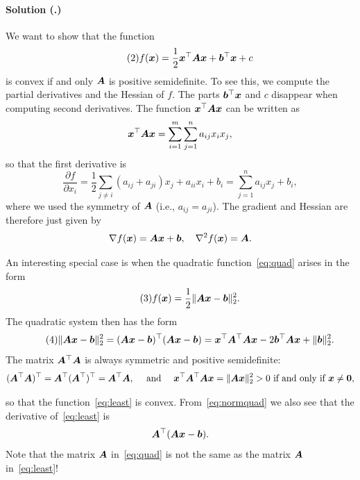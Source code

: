\documentclass{article}
\newcounter{problemSheetNumber}
\newcounter{problems}
\renewcommand{\solution}[1]{\paragraph{Solution (\theproblemSheetNumber.\theproblems)}\addtocounter{problems}{1}\label{#1}}
\begin{document}
\solution{pr:2} We want to show that the function
\begin{equation}\label{eq:quad}\tag{2}
f(\bm{x}) = \frac{1}{2}\bm{x}^{\top}\bm{A}\bm{x}+\bm{b}^{\top}\bm{x}+c  
 \end{equation}
is convex if and only $\bm{A}$ is positive semidefinite.
To see this, we compute the partial derivatives and the Hessian of $f$. The parts $\bm{b}^{\top}\bm{x}$ and $c$ disappear when computing second derivatives. The function $\bm{x}^{\top}\bm{A}\bm{x}$ can be written as
\begin{equation*}
 \bm{x}^{\top}\bm{A}\bm{x} = \sum_{i=1}^m\sum_{j=1}^n a_{ij}x_ix_j,
\end{equation*}
so that the first derivative is
\begin{equation*}
 \frac{\partial f}{\partial x_i} = \frac{1}{2} \sum_{j\neq i} (a_{ij}+a_{ji}) x_j + a_{ii}x_i+b_i = \sum_{j=1}^n a_{ij}x_j+b_i,
\end{equation*}
where we used the symmetry of $\bm{A}$ (i.e., $a_{ij}=a_{ji}$). The gradient and Hessian are therefore just given by
\begin{equation*}
 \nabla f(\bm{x}) = \bm{A}\bm{x}+\bm{b}, \quad \nabla^2f(\bm{x}) = \bm{A}.
\end{equation*}

An interesting special case is when the quadratic function~\eqref{eq:quad} arises in the form
\begin{equation}\label{eq:least}\tag{3}
 f(\bm{x}) = \frac{1}{2}\Vert {\bm{A}\bm{x}-\bm{b}}\Vert_2^2. 
\end{equation}
The quadratic system then has the form
\begin{equation}\label{eq:normquad}\tag{4}
 \Vert {\bm{A}\bm{x}-\bm{b}}\Vert_2^2 = (\bm{A}\bm{x}-\bm{b})^{\top}(\bm{A}\bm{x}-\bm{b}) = \bm{x}^{\top}\bm{A}^{\top}\bm{A}\bm{x}-2\bm{b}^{\top}\bm{A}\bm{x}+\Vert {\bm{b}}\Vert_2^2.
\end{equation}
The matrix $\bm{A}^{\top}\bm{A}$ is always symmetric and positive semidefinite:
\begin{equation*}
 (\bm{A}^{\top}\bm{A})^{\top} = \bm{A}^{\top}(\bm{A}^{\top})^{\top} = \bm{A}^{\top}\bm{A}, \quad \text{ and } \quad \bm{x}^{\top}\bm{A}^\top\bm{A}\bm{x} = \Vert {\bm{A}\bm{x}}\Vert_2^2>0 \text{ if and only if } \bm{x}\neq \bm{0},
\end{equation*}

so that the function~\eqref{eq:least} is convex. From~\eqref{eq:normquad} we also see that the derivative of~\eqref{eq:least} is
\begin{equation*}
 \bm{A}^{\top}(\bm{A}\bm{x}-\bm{b}).
\end{equation*}
Note that the matrix $\bm{A}$ in~\eqref{eq:quad} is not the same as the matrix $\bm{A}$ in~\eqref{eq:least}!
\end{document}
